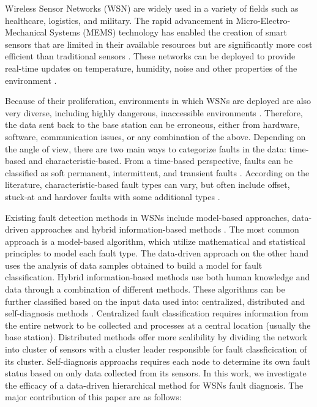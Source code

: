 Wireless Sensor Networks (WSN) are widely used in a variety of fields such as healthcare, logistics, and military. The rapid advancement in
Micro-Electro-Mechanical Systems (MEMS) technology has enabled the creation of smart sensors that are limited in their available resources but are
significantly more cost efficient than traditional sensors \cite{Yick2008, Chai2020}. These networks can be deployed to provide real-time updates on 
temperature, humidity, noise and other properties of the environment \cite{Yick2008, Chai2020, Ullo2020}.

Because of their proliferation, environments in which WSNs are deployed are also very diverse, including highly dangerous, inaccessible environments
\cite{Prasad2023}. Therefore, the data sent back to the base station can be erroneous, either from hardware, software, communication issues, or 
any combination of the above. Depending on the angle of view, there are two main ways to categorize faults in the data: time-based and
characteristic-based. From a time-based perspective, faults can be classified as soft permanent, intermittent, and transient faults \cite{Prasad2023}.
According on the literature, characteristic-based fault types can vary, but often include offset, stuck-at and hardover faults with some
additional types \cite{Shi2024, Saeed2021}.

Existing fault detection methods in WSNs include model-based approaches, data-driven approaches and hybrid information-based methods \cite{Shi2024}.
The most common approach is a model-based algorithm, which utilize mathematical and statistical principles to model each fault type. The data-driven 
approach on the other hand uses the analysis of data samples obtained to build a model for fault classification. Hybrid information-based methods use 
both human knowledge and data through a combination of different methods. These algorithms can be further classified based on the input data used
into: centralized, distributed and self-diagnosis methods \cite{Prasad2023, Takele2024}. Centralized fault classification requires information from the
entire network to be collected and processes at a central location (usually the base station). Distributed methods offer more scalibility by dividing
the network into cluster of sensors with a cluster leader responsible for fault classficication of its cluster. Self-diagnosis approachs requires each
node to determine its own fault status based on only data collected from its sensors. In this work, we investigate the efficacy of a data-driven
hierarchical method for WSNs fault diagnosis. The major contribution of this paper are as follows:

